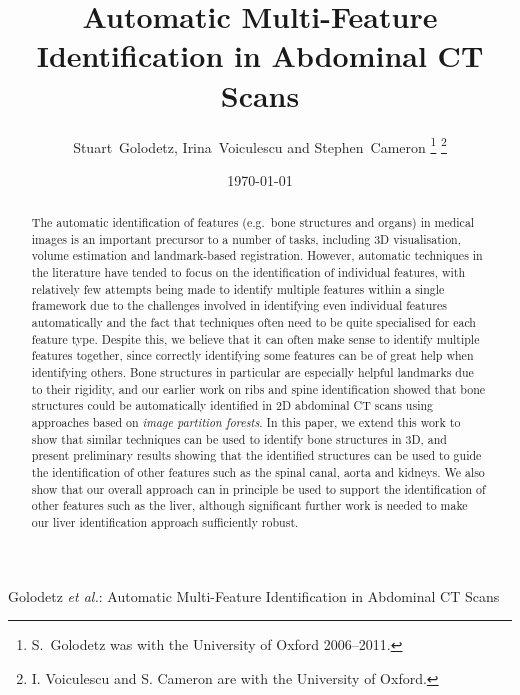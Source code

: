 \documentclass[10pt,twocolumn,twoside]{IEEEtran}
\begin{document}
\title{Automatic Multi-Feature Identification in Abdominal CT Scans}

\author{Stuart~Golodetz, Irina~Voiculescu and Stephen~Cameron%
\thanks{S.~Golodetz was with the University of Oxford 2006--2011.}%
\thanks{I. Voiculescu and S. Cameron are with the University of Oxford.}}

\date{\today}

%
{Golodetz \MakeLowercase{\textit{et al.}}: Automatic Multi-Feature Identification in Abdominal CT Scans}


\maketitle

\begin{abstract}
\noindent The automatic identification of features (e.g.~bone structures and organs) in medical images is an important precursor to a number of tasks, including 3D visualisation, volume estimation and landmark-based registration. However, automatic techniques in the literature have tended to focus on the identification of individual features, with relatively few attempts being made to identify multiple features within a single framework due to the challenges involved in identifying even individual features automatically and the fact that techniques often need to be quite specialised for each feature type. Despite this, we believe that it can often make sense to identify multiple features together, since correctly identifying some features can be of great help when identifying others. Bone structures in particular are especially helpful landmarks due to their rigidity, and our earlier work on ribs and spine identification showed that bone structures could be automatically identified in 2D abdominal CT scans using approaches based on \emph{image partition forests}. In this paper, we extend this work to show that similar techniques can be used to identify bone structures in 3D, and present preliminary results showing that the identified structures can be used to guide the identification of other features such as the spinal canal, aorta and kidneys. We also show that our overall approach can in principle be used to support the identification of other features such as the liver, although significant further work is needed to make our liver identification approach sufficiently robust.
\end{abstract}
\end{document}
